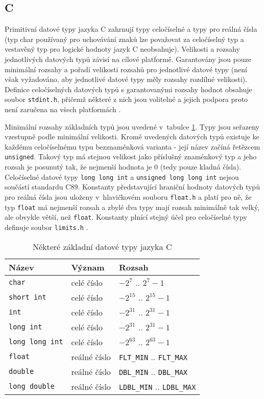 \documentclass[onepage, a4paper, 12pt]{bakalarka}
\begin{document}
\subsection{C}
Primitivní datové typy jazyka C zahrnují typy celočíselné a typy pro reálná čísla (typ char používaný pro uchovávání znaků lze považovat za celočíselný typ a vestavěný typ pro logické hodnoty jazyk C neobsahuje). Velikosti a rozsahy jednotlivých datových typů závisí na cílové platformě. Garantovány jsou pouze minimální rozsahy a pořadí velikosti rozsahů pro jednotlivé datové typy (není však vyžadováno, aby jednotlivé datové typy měly rozsahy rozdílné velikosti). Definice celočíselných datových typů s garantovanými rozsahy hodnot obsahuje soubor \texttt{stdint.h}, přičemž některé z nich jsou volitelné a jejich podpora proto není zaručena na všech platformách \cite{c-guide, cpp-guide-stdint}.\par

Minimální rozsahy základních typů jsou uvedené v~tabulce \ref{table:c-types}. Typy jsou seřazeny vzestupně podle minimální velikosti. Kromě uvedených datových typů existuje ke každému celočíselnému typu bezznaménková varianta - její název začíná řetězcem \texttt{unsigned}. Takový typ má stejnou velikost jako příslušný znaménkový typ a jeho rozsah je posunutý tak, že nejmenší hodnota je 0 (tedy pouze kladná čísla). Celočíselné datové typy \texttt{long long int} a \texttt{unsigned long long int} nejsou součástí standardu C89. Konstanty představující hraniční hodnoty datových typů pro reálná čísla jsou uloženy v~hlavičkovém souboru \texttt{float.h} a platí pro ně, že typ \texttt{float} má nejmenší rozsah a zbylé dva typy mají rozsah minimálně tak velký, ale obvykle větší, než \texttt{float}. Konstanty plnící stejný účel pro celočíselné typy definuje soubor \texttt{limits.h} \cite{c-guide}.

\begin{table}\centering
\caption{Některé základní datové typy jazyka C}
\begin{tabular}{| l | l | l |}
\hline
\textbf{Název} & \textbf{Význam} & \textbf{Rozsah} \\ \hline
\texttt{char} & celé číslo & $-2^7$ .. $2^7-1$ \\ \hline
\texttt{short int} & celé číslo & $-2^{15}$ .. $2^{15}-1$ \\ \hline
\texttt{int} & celé číslo & $-2^{31}$ .. $2^{31}-1$ \\ \hline
\texttt{long int} & celé číslo & $-2^{31}$ .. $2^{31}-1$ \\ \hline
\texttt{long long int} & celé číslo & $-2^{63}$ .. $2^{63}-1$ \\ \hline
\texttt{float} & reálné číslo & \texttt{FLT\_MIN} .. \texttt{FLT\_MAX} \\ \hline
\texttt{double} & reálné číslo & \texttt{DBL\_MIN} .. \texttt{DBL\_MAX} \\ \hline
\texttt{long double} & reálné číslo & \texttt{LDBL\_MIN} .. \texttt{LDBL\_MAX} \\ \hline
\end{tabular}
\label{table:c-types}
\end{table}
\end{document}
